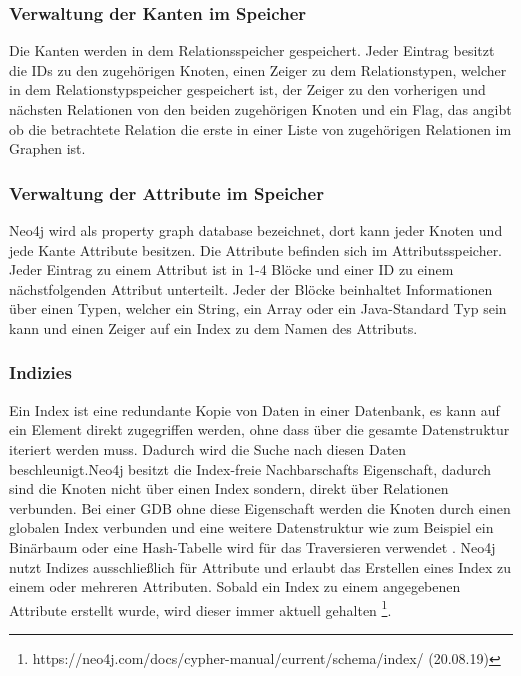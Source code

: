 \subsubsection{Verwaltung der Kanten im Speicher}
Die Kanten werden in dem Relationsspeicher gespeichert. Jeder Eintrag besitzt die IDs zu den zugehörigen Knoten, einen Zeiger zu dem Relationstypen, welcher in dem Relationstypspeicher gespeichert ist, der Zeiger zu den vorherigen und nächsten Relationen von den beiden zugehörigen Knoten und ein Flag, das angibt ob die betrachtete Relation die erste in einer Liste von zugehörigen Relationen im Graphen ist. 
\subsubsection{Verwaltung der Attribute im Speicher}
Neo4j wird als property graph database bezeichnet, dort kann jeder Knoten und jede Kante Attribute besitzen. Die Attribute befinden sich im Attributsspeicher. Jeder Eintrag zu einem Attribut ist in 1-4 Blöcke und einer ID zu einem nächstfolgenden Attribut unterteilt. Jeder der Blöcke beinhaltet Informationen über einen Typen, welcher ein String, ein Array oder ein Java-Standard Typ sein kann und einen Zeiger auf ein Index zu dem Namen des Attributs.  
\subsubsection{Indizies}
Ein Index ist eine redundante Kopie von Daten in einer Datenbank, es kann auf ein Element direkt zugegriffen werden, ohne dass über die gesamte Datenstruktur iteriert werden muss. Dadurch wird die Suche nach diesen Daten beschleunigt.Neo4j besitzt die Index-freie Nachbarschafts Eigenschaft, dadurch sind die Knoten nicht über einen Index  sondern, direkt über Relationen verbunden. Bei einer GDB ohne diese Eigenschaft werden die Knoten durch einen globalen Index verbunden und eine weitere Datenstruktur wie zum Beispiel ein Binärbaum oder eine Hash-Tabelle wird für das Traversieren verwendet \parencite{robinson2013graph}. \newline
Neo4j nutzt Indizes ausschließlich für Attribute und erlaubt das Erstellen eines Index zu einem oder mehreren Attributen. Sobald ein Index zu einem angegebenen Attribute erstellt wurde, wird dieser immer aktuell gehalten \footnote{https://neo4j.com/docs/cypher-manual/current/schema/index/ (20.08.19)}.  	
